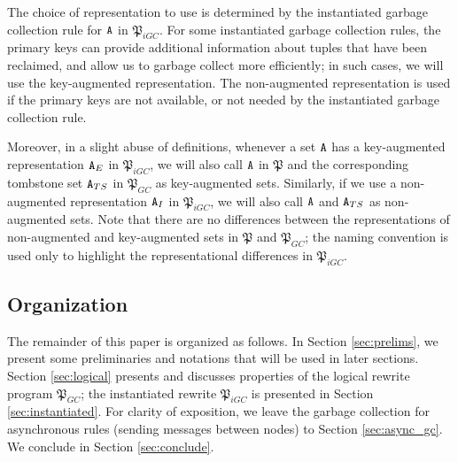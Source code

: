 The choice of representation to use is determined by the instantiated garbage collection rule for $\tt{A}$ in $\mathfrak{P}_{iGC}$.
For some instantiated garbage collection rules, the primary keys can provide additional information about tuples that have been reclaimed, and allow us to garbage collect more efficiently;
in such cases, we will use the key-augmented representation.
The non-augmented representation is used if the primary keys are not available, or not needed by the instantiated garbage collection rule.

Moreover, in a slight abuse of definitions, whenever a set $\tt{A}$ has a key-augmented representation $\tt{A}_E$ in $\mathfrak{P}_{iGC}$, we will also call $\tt{A}$ in $\mathfrak{P}$ and the corresponding tombstone set $\tt{A}_{TS}$ in $\mathfrak{P}_{GC}$ as key-augmented sets.
Similarly, if we use a non-augmented representation $\tt{A}_I$ in $\mathfrak{P}_{iGC}$, we will also call $\tt{A}$ and $\tt{A}_{TS}$ as non-augmented sets.
Note that there are no differences between the representations of non-augmented and key-augmented sets in $\mathfrak{P}$ and $\mathfrak{P}_{GC}$;
the naming convention is used only to highlight the representational differences in $\mathfrak{P}_{iGC}$.



\subsection{Organization}
The remainder of this paper is organized as follows.
In Section \ref{sec:prelims}, we present some preliminaries and notations that will be used in later sections.
Section \ref{sec:logical} presents and discusses properties of the logical rewrite program $\mathfrak{P}_{GC}$;
the instantiated rewrite $\mathfrak{P}_{iGC}$ is presented in Section \ref{sec:instantiated}.
For clarity of exposition, we leave the garbage collection for asynchronous rules (sending messages between nodes) to Section \ref{sec:async_gc}.
We conclude in Section \ref{sec:conclude}.

